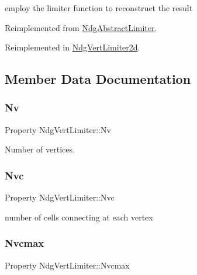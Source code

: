 employ the limiter function to reconstruct the result 



Reimplemented from \hyperlink{class_ndg_abstract_limiter_a8f4cac5fdb4705c686c64001b356f885}{Ndg\+Abstract\+Limiter}.



Reimplemented in \hyperlink{class_ndg_vert_limiter2d_a26be61b8865340e1480ace3abb582d73}{Ndg\+Vert\+Limiter2d}.



\subsection{Member Data Documentation}
\mbox{\label{class_ndg_vert_limiter_ab29fe1699e4b37765869b5aabd253416}} 
\subsubsection{\texorpdfstring{Nv}{Nv}}
{\footnotesize\ttfamily Property Ndg\+Vert\+Limiter\+::\+Nv\hspace{0.3cm}{\ttfamily [protected]}}



Number of vertices. 

\mbox{\label{class_ndg_vert_limiter_a57d41a4b1bcb633d7027e520a4369ca1}} 
\subsubsection{\texorpdfstring{Nvc}{Nvc}}
{\footnotesize\ttfamily Property Ndg\+Vert\+Limiter\+::\+Nvc\hspace{0.3cm}{\ttfamily [protected]}}



number of cells connecting at each vertex 

\mbox{\label{class_ndg_vert_limiter_a7612024d183c8008e129b53182c5f2d7}} 
\subsubsection{\texorpdfstring{Nvcmax}{Nvcmax}}
{\footnotesize\ttfamily Property Ndg\+Vert\+Limiter\+::\+Nvcmax\hspace{0.3cm}{\ttfamily [protected]}}



